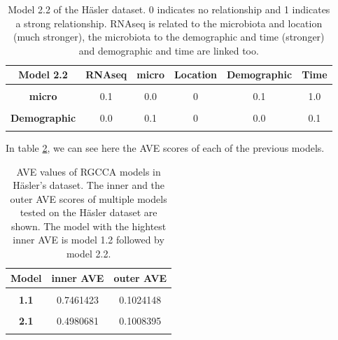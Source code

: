 \documentclass[
  12pt,
  a4paper,
  twoside,
  openright]{book}
\begin{document}
\begin{table}[H]

\caption[Model 2.2 of the Häsler dataset.]{\label{tab:hasler-model-2-2}Model 2.2 of the Häsler dataset. 0 indicates no relationship and 1 indicates a strong relationship. RNAseq is related to the microbiota and location (much stronger), the microbiota to the demographic and time (stronger) and demographic and time are linked too.}
\centering
\begin{tabular}[t]{>{}c|c|c|c|c|c}
\hline
\textbf{Model 2.2} & \textbf{RNAseq} & \textbf{micro} & \textbf{Location} & \textbf{Demographic} & \textbf{Time}\\
\hline
\textbf{\cellcolor{gray!6}{RNAseq}} & \cellcolor{gray!6}{0.0} & \cellcolor{gray!6}{0.1} & \cellcolor{gray!6}{1} & \cellcolor{gray!6}{0.0} & \cellcolor{gray!6}{0.0}\\
\hline
\textbf{micro} & 0.1 & 0.0 & 0 & 0.1 & 1.0\\
\hline
\textbf{\cellcolor{gray!6}{Location}} & \cellcolor{gray!6}{1.0} & \cellcolor{gray!6}{0.0} & \cellcolor{gray!6}{0} & \cellcolor{gray!6}{0.0} & \cellcolor{gray!6}{0.0}\\
\hline
\textbf{Demographic} & 0.0 & 0.1 & 0 & 0.0 & 0.1\\
\hline
\textbf{\cellcolor{gray!6}{Time}} & \cellcolor{gray!6}{0.0} & \cellcolor{gray!6}{1.0} & \cellcolor{gray!6}{0} & \cellcolor{gray!6}{0.1} & \cellcolor{gray!6}{0.0}\\
\hline
\end{tabular}
\end{table}

In table \ref{tab:hasler-aves}, we can see here the AVE scores of each of the previous models.

\begin{table}[H]

\caption[AVE values of RGCCA models in Häsler's dataset.]{\label{tab:hasler-aves}AVE values of RGCCA models in Häsler's dataset. The inner and the outer AVE scores of multiple models tested on the Häsler dataset are shown. The model with the hightest inner AVE is model 1.2 followed by model 2.2.}
\centering
\begin{tabular}[t]{>{}c|c|c}
\hline
\textbf{Model} & \textbf{inner AVE} & \textbf{outer AVE}\\
\hline
\textbf{\cellcolor{gray!6}{0}} & \cellcolor{gray!6}{0.8217371} & \cellcolor{gray!6}{0.0961236}\\
\hline
\textbf{1.1} & 0.7461423 & 0.1024148\\
\hline
\textbf{\cellcolor{gray!6}{1.2}} & \cellcolor{gray!6}{0.8349410} & \cellcolor{gray!6}{0.1025486}\\
\hline
\textbf{2.1} & 0.4980681 & 0.1008395\\
\hline
\textbf{\cellcolor{gray!6}{2.2}} & \cellcolor{gray!6}{0.7513065} & \cellcolor{gray!6}{0.1009915}\\
\hline
\end{tabular}
\end{table}
\end{document}
